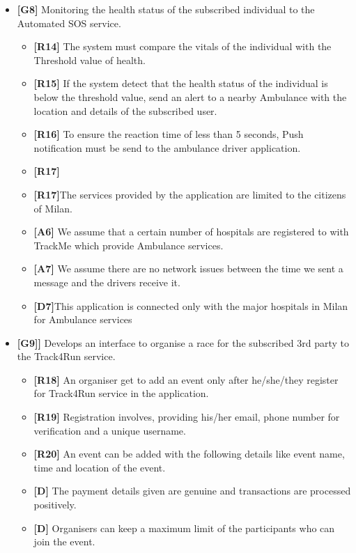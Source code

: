 \begin{itemize}
\item\textbf{[G8]} Monitoring the health status of the subscribed individual to the Automated SOS service.

\begin{itemize}
\item\textbf{[R14]} The system must compare the vitals of the individual with the Threshold value of health.
\item\textbf{[R15]} If the system detect that the health status of the individual is below the threshold value, send an alert to a nearby Ambulance with the location and details of the subscribed user.
\item\textbf{[R16]} To ensure the reaction time of less than 5 seconds, Push notification must be send to the ambulance driver application.
\item\textbf{[R17]} 
\item\textbf{[R17]}The services provided by the application are limited to the citizens of Milan.
\item \textbf{[A6]} We assume that a certain number of hospitals are registered to with TrackMe which provide Ambulance services.
\item \textbf{[A7]} We assume there are no network issues between the time we sent a message and the drivers receive it.
\item\textbf{[D7]}This application is connected only with the major hospitals in Milan for Ambulance services\newline
\end{itemize}

\item\textbf{[G9]]}  Develops an interface to organise a race for the subscribed 3rd party to the Track4Run service.

\begin{itemize}
\item\textbf{[R18]} An organiser get to add an event only after he/she/they register for Track4Run service in the application.
\item\textbf{[R19]} Registration involves, providing his/her email, phone number for verification and a unique username.
\item\textbf{[R20]} An event can be added with the following details like event name, time and location of the event.
\item\textbf{[D]} The payment details given are genuine and transactions are processed positively.
\item\textbf{[D]} Organisers can keep a maximum limit of the participants who can join the event.\newline
\end{itemize}


\end{itemize}
